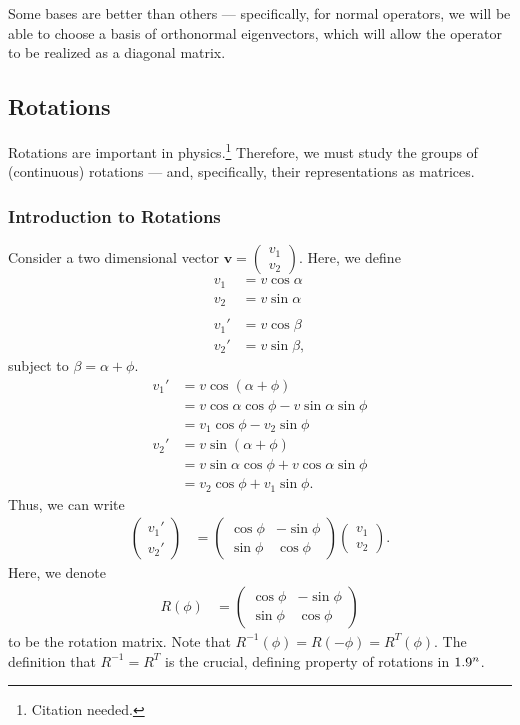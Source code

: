 \documentclass[10pt]{mypackage}
\begin{document}
Some bases are better than others --- specifically, for normal operators, we will be able to choose a basis of orthonormal eigenvectors, which will allow the operator to be realized as a diagonal matrix.
\subsection{Rotations}%
Rotations are important in physics.\footnote{Citation needed.} Therefore, we must study the groups of (continuous) rotations --- and, specifically, their representations as matrices.
\subsubsection{Introduction to Rotations}%
Consider a two dimensional vector $\mathbf{v} = \begin{pmatrix}v_1\\v_2\end{pmatrix}$. Here, we define
\begin{align*}
  v_{1} &= v\cos\alpha\\
  v_2 &= v\sin\alpha\\
  \\
  v_1' &= v\cos\beta\\
  v_2' &= v\sin\beta,
\end{align*}
subject to $\beta = \alpha + \phi$.
\begin{align*}
  v_1' &= v \cos\left(\alpha + \phi\right)\\
       &= v\cos\alpha\cos\phi - v\sin\alpha\sin\phi\\
       &= v_1\cos\phi - v_2\sin\phi\\
  v_2' &= v\sin\left(\alpha + \phi\right)\\
       &= v\sin\alpha\cos\phi + v\cos\alpha\sin\phi\\
       &= v_2\cos\phi + v_1\sin\phi.
\end{align*}
Thus, we can write
\begin{align*}
  \begin{pmatrix}v_1'\\v_2'\end{pmatrix} &= \begin{pmatrix}\cos\phi & -\sin\phi \\ \sin\phi & \cos\phi\end{pmatrix} \begin{pmatrix}v_1\\v_2\end{pmatrix}.
\end{align*}
Here, we denote
\begin{align*}
  R\left(\phi\right) &= \begin{pmatrix}\cos\phi & -\sin\phi\\ \sin\phi & \cos\phi\end{pmatrix}
\end{align*}
to be the rotation matrix. Note that $R^{-1}\left(\phi\right) = R\left(-\phi\right) = R^{T}\left(\phi\right)$. The definition that $R^{-1} = R^{T}$ is the crucial, defining property of rotations in $1.9^n$.\newline
\end{document}
